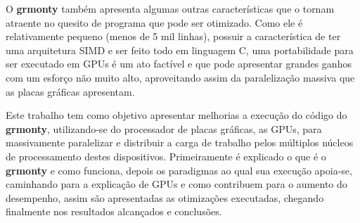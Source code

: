 O \textbf{grmonty} também apresenta algumas outras características que o tornam atraente no quesito de programa que pode ser otimizado. Como ele é relativamente pequeno (menos de 5 mil linhas), possuir a característica de ter uma arquitetura SIMD e ser feito todo em linguagem C, uma portabilidade para ser executado em GPUs é um ato factível e que pode apresentar grandes ganhos com um esforço não muito alto, aproveitando assim da paralelização massiva que as placas gráficas apresentam.

Este trabalho tem como objetivo apresentar melhorias a execução do código do \textbf{grmonty}, utilizando-se do processador de placas gráficas, as GPUs, para massivamente paralelizar e distribuir a carga de trabalho pelos múltiplos núcleos de processamento destes dispositivos. Primeiramente é explicado o que é o \textbf{grmonty} e como funciona, depois os paradigmas ao qual sua execução apoia-se, caminhando para a explicação de GPUs e como contribuem para o aumento do desempenho, assim são apresentadas as otimizações executadas, chegando finalmente nos resultados alcançados e conclusões.
